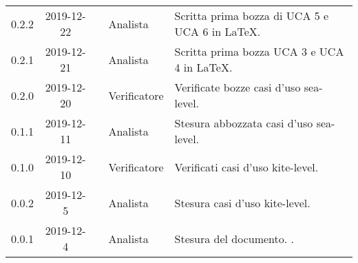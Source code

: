 {\begin{longtable}{ c c  C{4cm}  C{3cm} C{4cm}}
0.2.2 & 2019-12-22 & \PF{} & Analista & Scritta prima bozza di UCA 5 e UCA 6 in LaTeX. \\

0.2.1 & 2019-12-21 & \PF{} & Analista & Scritta prima bozza UCA 3 e UCA 4 in LaTeX. \\

0.2.0 & 2019-12-20 & \SE{} & Verificatore & Verificate bozze casi d'uso sea-level. \\

0.1.1 & 2019-12-11 & \DF{} & Analista & Stesura abbozzata casi d'uso sea-level. \\

0.1.0 & 2019-12-10 & \BR{} & Verificatore & Verificati casi d'uso kite-level. \\

0.0.2 & 2019-12-5 & \CE{} & Analista & Stesura casi d'uso kite-level. \\

0.0.1 & 2019-12-4 & \CE{} & Analista & Stesura del documento. . \\		
		
\end{longtable}
}